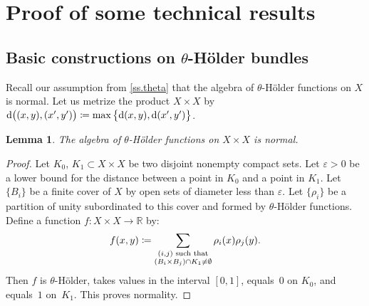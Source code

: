 \documentclass[10pt]{amsart}
\def\vcentcolon{\mathrel{\mathop\ordinarycolon}}
\providecommand\ordinarycolon{:}
\providecommand*\coloneqq{\vcentcolon\mathrel{\mkern-1.2mu}=}
\theoremstyle{plain}
\newtheorem{lemma}[theorem]{Lemma}
\theoremstyle{definition}
\newcommand{\RR}{\mathbb{R}}
\newcommand{\dd}{\mathrm{d}}
\let\epsilon\varepsilon
\begin{document}
\appendix

\section{Proof of some technical results}
\label{s.technical}

\subsection{Basic constructions on \texorpdfstring{$\theta$}{theta}-Hölder bundles}\label{ss.basic}

Recall our assumption from \cref{ss.theta} that the algebra of $\theta$-Hölder functions on $X$ is normal. Let us metrize the product $X \times X$ by $\dd\big( (x,y), (x',y') \big) \coloneqq \max\big\{ \dd(x,y), \dd(x',y') \big\}$.

\begin{lemma}\label{l.square}
The algebra of $\theta$-Hölder functions on $X \times X$ is normal.
\end{lemma}

\begin{proof}
Let $K_0$, $K_1 \subset X \times X$ be two disjoint nonempty compact sets.
Let $\epsilon>0$ be a lower bound for the distance between a point in $K_0$ and a point in $K_1$. Let $\{B_i\}$ be a finite cover of $X$ by open sets of diameter less than $\epsilon$. Let $\{\rho_i\}$ be a partition of unity subordinated to this cover and formed by $\theta$-Hölder functions. Define a function $f \colon X \times X \to \RR$ by:
\[
f(x,y) \coloneqq \sum_{\substack{(i,j) \text{ such that} \\ (B_i \times B_j)\cap K_1 \neq \emptyset}} \rho_i(x) \rho_j(y).
\]
Then $f$ is $\theta$-Hölder, takes values in the interval $[0,1]$, equals~$0$ on $K_0$, and equals~$1$ on~$K_1$. This proves normality.
\end{proof}
\end{document}
